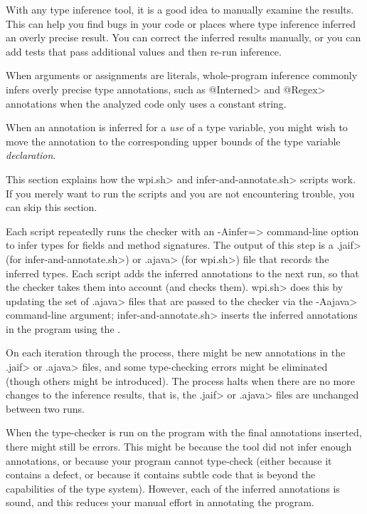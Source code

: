 With any type inference tool, it is a good idea to manually examine the
results.  This can help you find bugs in your code or places where type
inference inferred an overly precise result.
You can correct the inferred results manually, or you can
add tests that pass additional values and then re-run inference.

When arguments or assignments are literals, whole-program inference
commonly infers overly precise type annotations, such as \<@Interned> and
\<@Regex> annotations when the analyzed code only uses a constant string.

When an annotation is inferred for a \emph{use} of a type variable,
you might wish to move the annotation
to the corresponding upper bounds of the type variable \emph{declaration}.



This section explains how the \<wpi.sh> and \<infer-and-annotate.sh> scripts work.  If you
merely want to run the scripts and you are not encountering trouble, you can
skip this section.

Each script repeatedly runs the checker with an \<-Ainfer=> command-line option to infer
types for fields and method signatures.  The output of this step
is a \<.jaif> (for \<infer-and-annotate.sh>) or \<.ajava> (for \<wpi.sh>) file that records the inferred types.
Each script adds the inferred annotations to the next run, so that the checker takes them into
account (and checks them). \<wpi.sh> does this by updating the set of \<.ajava> files that are passed
to the checker via the \<-Aajava> command-line argument;
\<infer-and-annotate.sh> inserts the inferred annotations in the program using the
.

On each
iteration through the process, there might be new annotations in the \<.jaif> or \<.ajava>
files, and some type-checking errors might be eliminated (though others might
be introduced).
The process halts when there are no more changes to the inference results,
that is, the \<.jaif> or \<.ajava> files are unchanged between two runs.

When the type-checker is run on the program with the final annotations
inserted, there might still be errors.  This might be because the tool did
not infer enough annotations, or because your program cannot type-check
(either because it contains a defect, or because it contains subtle code that
is beyond the capabilities of the type system).
However, each of the inferred annotations is sound, and this reduces your
manual effort in annotating the program.

